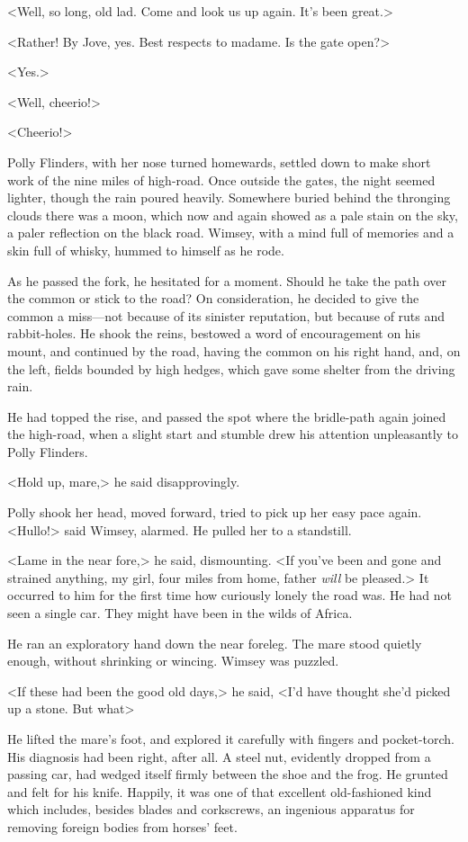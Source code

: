 <Well, so long, old lad. Come and look us up again. It's been great.>

<Rather! By Jove, yes. Best respects to madame. Is the gate open?>

<Yes.>

<Well, cheerio!>

<Cheerio!>

Polly Flinders, with her nose turned homewards, settled down to make short work of the nine miles of high-road. Once outside the gates, the night seemed lighter, though the rain poured heavily. Somewhere buried behind the thronging clouds there was a moon, which now and again showed as a pale stain on the sky, a paler reflection on the black road. Wimsey, with a mind full of memories and a skin full of whisky, hummed to himself as he rode.

As he passed the fork, he hesitated for a moment. Should he take the path over the common or stick to the road? On consideration, he decided to give the common a miss—not because of its sinister reputation, but because of ruts and rabbit-holes. He shook the reins, bestowed a word of encouragement on his mount, and continued by the road, having the common on his right hand, and, on the left, fields bounded by high hedges, which gave some shelter from the driving rain.

He had topped the rise, and passed the spot where the bridle-path again joined the high-road, when a slight start and stumble drew his attention unpleasantly to Polly Flinders.

<Hold up, mare,> he said disapprovingly.

Polly shook her head, moved forward, tried to pick up her easy pace again. <Hullo!> said Wimsey, alarmed. He pulled her to a standstill.

<Lame in the near fore,> he said, dismounting. <If you've been and gone and strained anything, my girl, four miles from home, father \emph{will} be pleased.> It occurred to him for the first time how curiously lonely the road was. He had not seen a single car. They might have been in the wilds of Africa.

He ran an exploratory hand down the near foreleg. The mare stood quietly enough, without shrinking or wincing. Wimsey was puzzled.

<If these had been the good old days,> he said, <I'd have thought she'd picked up a stone. But what\longdash>

He lifted the mare's foot, and explored it carefully with fingers and pocket-torch. His diagnosis had been right, after all. A steel nut, evidently dropped from a passing car, had wedged itself firmly between the shoe and the frog. He grunted and felt for his knife. Happily, it was one of that excellent old-fashioned kind which includes, besides blades and corkscrews, an ingenious apparatus for removing foreign bodies from horses' feet.

